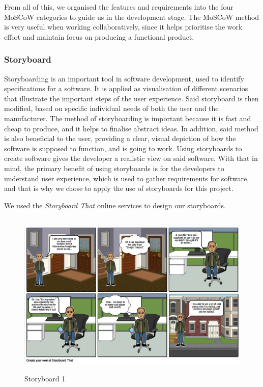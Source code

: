 \documentclass[12p]{article}
\begin{document}
    From all of this, we organised the features and requirements into the four MoSCoW categories to guide us in the development stage. The MoSCoW method is very useful when working collaboratively, since it helps prioritise the work effort and maintain focus on producing a functional product.
	
	\subsubsection{Storyboard}

	Storyboarding is an important tool in software development, used to identify specifications for a software. It is applied as visualisation of different scenarios that illustrate the important steps of the user experience. Said storyboard is then modified, based on specific individual needs of both the user and the manufacturer. The method of storyboarding is important because it is fast and cheap to produce, and it helps to finalise abstract ideas. In addition, said method is also beneficial to the user, providing a clear, visual depiction of how the software is supposed to function, and is going to work. Using storyboards to create software gives the developer a realistic view on said software. With that in mind, the primary benefit of using storyboards is for the developers to understand user experience, which is used to gather requirements for software, and that is why we chose to apply the use of storyboards for this project.

	We used the \textit{Storyboard That} \cite{StoryboardThat} online services to design our storyboards.
	
	\begin{figure}[ht]
	    \center
        \includegraphics[height=8cm,keepaspectratio]{pics/story1.png}
        \caption{Storyboard 1}
    \end{figure}
	
\end{document}
